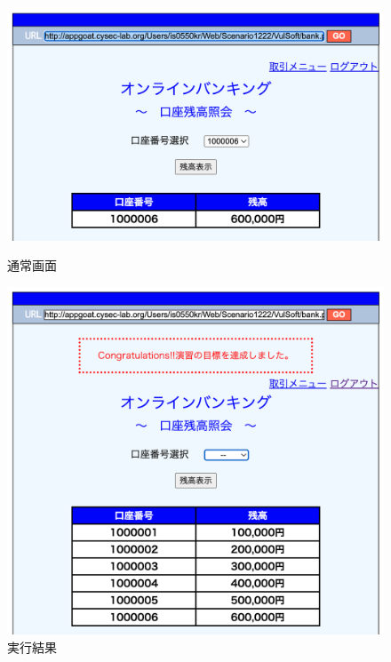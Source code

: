 \documentclass[dvipdfmx,autodetect-engine,titlepage]{jsarticle}
\begin{document}
\begin{figure}[H]
  \centering
  \begin{minipage}[b]{0.45\linewidth}
  \begin{center}
    \includegraphics[keepaspectratio,scale=0.3]{sql6.png}
    \end{center}
    \caption{通常画面}
  \end{minipage}
  \begin{minipage}[b]{0.45\linewidth}
  \begin{center}
    \includegraphics[keepaspectratio,scale=0.3]{sql7.png}
    \end{center}
    \caption{実行結果}
  \end{minipage}
\end{figure}
\end{document}
